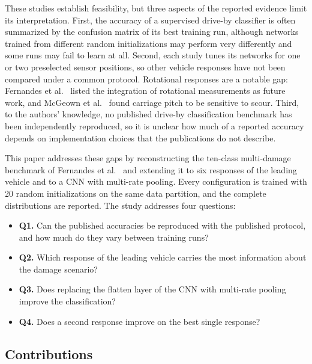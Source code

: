 These studies establish feasibility, but three aspects of the reported evidence
limit its interpretation. First, the accuracy of a supervised drive-by
classifier is often summarized by the confusion matrix of its best training
run, although networks trained from different random initializations may
perform very differently and some runs may fail to learn at all. Second, each study tunes its networks for
one or two preselected sensor positions, so other vehicle responses have not
been compared under a common protocol. Rotational responses are a notable gap:
Fernandes et al.~\cite{fernandes2025early} listed the integration of rotational
measurements as future work, and McGeown et al.~\cite{mcgeown2024pitch} found
carriage pitch to be sensitive to scour. Third, to the authors' knowledge, no
published drive-by classification benchmark has been independently reproduced,
so it is unclear how much of a reported accuracy depends on implementation
choices that the publications do not describe.

This paper addresses these gaps by reconstructing the ten-class multi-damage
benchmark of Fernandes et al.~\cite{fernandes2025early} and extending it to six
responses of the leading vehicle and to a CNN with multi-rate pooling. Every
configuration is trained with 20 random initializations on the same data
partition, and the complete distributions are reported. The study addresses
four questions:
\begin{itemize}
  \item \textbf{Q1.} Can the published accuracies be reproduced with the
  published protocol, and how much do they vary between training runs?
  \item \textbf{Q2.} Which response of the leading vehicle carries the most
  information about the damage scenario?
  \item \textbf{Q3.} Does replacing the flatten layer of the CNN with
  multi-rate pooling improve the classification?
  \item \textbf{Q4.} Does a second response improve on the best single
  response?
\end{itemize}

\subsection{Contributions}
\label{sec:contributions}

